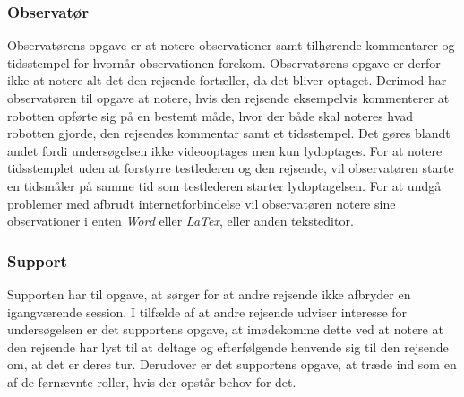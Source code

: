 \subsubsection*{Observatør}
Observatørens opgave er at notere observationer samt tilhørende kommentarer og tidsstempel for hvornår observationen forekom. Observatørens opgave er derfor ikke at notere alt det den rejsende fortæller, da det bliver optaget. Derimod har observatøren til opgave at notere, hvis den rejsende eksempelvis kommenterer at robotten opførte sig på en bestemt måde, hvor der både skal noteres hvad robotten gjorde, den rejsendes kommentar samt et tidsstempel. Det gøres blandt andet fordi undersøgelsen ikke videooptages men kun lydoptages. For at notere tidsstemplet uden at forstyrre testlederen og den rejsende, vil observatøren starte en tidsmåler på samme tid som testlederen starter lydoptagelsen. For at undgå problemer med afbrudt internetforbindelse vil observatøren notere sine observationer i enten \textit{Word} eller \textit{LaTex}, eller anden teksteditor.      
 
\subsubsection*{Support}
Supporten har til opgave, at sørger for at andre rejsende ikke afbryder en igangværende session. I tilfælde af at andre rejsende udviser interesse for undersøgelsen er det supportens opgave, at imødekomme dette ved at notere at den rejsende har lyst til at deltage og efterfølgende henvende sig til den rejsende om, at det er deres tur. Derudover er det supportens opgave, at træde ind som en af de førnævnte roller, hvis der opstår behov for det.  


